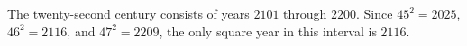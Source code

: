 The twenty-second century consists of years $2101$ through $2200$. Since $45^2=2025$, $46^2=2116$, and $47^2=2209$, the only square year in this interval is $\boxed{2116}$.
